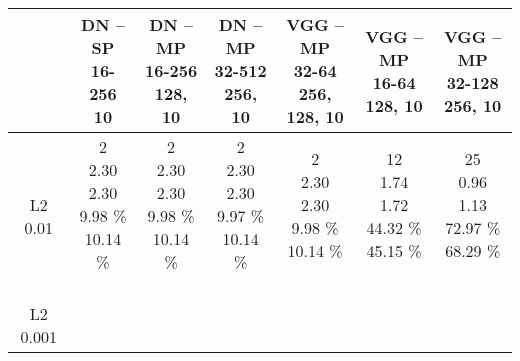 \begin{center}
\begin{tabular}{ |c|c|c|c|c|c|c| }
\hline
& \thead{DN -- SP\\16-256\\10} & \thead{DN -- MP\\16-256\\128, 10} & \thead{DN -- MP\\32-512\\256, 10} & \thead{VGG -- MP\\32-64\\256, 128, 10} & \thead{VGG -- MP\\16-64\\128, 10} & \thead{VGG -- MP\\32-128\\256, 10} \\
\hline   
\thead{\\L2 0.01} & \makecell{
2 \\
2.30 \\
2.30 \\
9.98 \% \\
10.14 \% \\
} & \makecell{
2 \\
2.30 \\
2.30 \\
9.98 \% \\
10.14 \% \\
} & \makecell{
2 \\
2.30 \\
2.30 \\
9.97 \% \\
10.14 \% \\
} & \makecell{
2 \\
2.30 \\
2.30 \\
9.98 \% \\
10.14 \% \\
} & \makecell{
12 \\
1.74 \\
1.72 \\
44.32 \% \\
45.15 \% \\
} & \makecell{
25 \\
0.96 \\
1.13 \\
72.97 \% \\
68.29 \% \\
} \\
\hline
\thead{\\L2 0.001} & \makecell{
}
\end{tabular}
\end{center}
